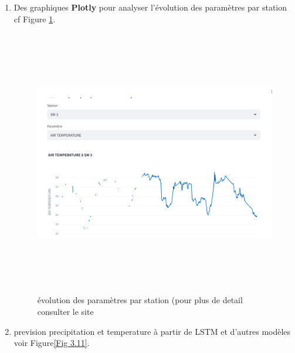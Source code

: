 \documentclass[a4paper,12pt,openany]{report}
\begin{document}
\begin{enumerate}
\begin{figure}[H]
\begin{center}
		\end{center}
	\end{figure}%
	\item Des graphiques \textbf{Plotly} pour analyser l’évolution des paramètres par station cf Figure \ref{Fig 3.8}.
	
	\begin{figure}[H]
		\begin{center}
		 \begin{minipage}{\textwidth}
		    \begin{center}
		    \includegraphics[width=1\textwidth,height=4.6in]{images/SITE_PAD.png}
		    \end{center}
		    \end{minipage}
			\caption{évolution des paramètres par station (pour plus de detail consulter le site \label{Fig 3.8}}
		\end{center}
	\end{figure}%
	

	
	\quad

		\item prevision precipitation et temperature à partir de LSTM et d'autres modèles voir Figure\ref{Fig 3.11}.
	

\end{enumerate}
\end{document}
